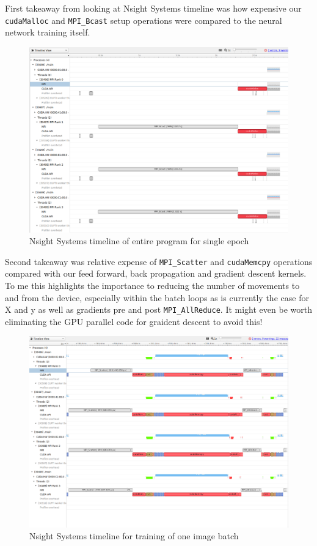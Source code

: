 \documentclass[12pt,letterpaper,twoside]{article}
\begin{document}
First takeaway from looking at Nsight Systems timeline was how expensive our 
\texttt{cudaMalloc} and \texttt{MPI\_Bcast} setup operations were compared to the 
neural network training itself. 

\begin{figure}[!htbp]
    \centering
    \includegraphics[scale=0.35]{nsight_systems_overview.png}
    \caption{Nsight Systems timeline of entire program for single epoch}
\end{figure}

Second takeaway was relative expense of \texttt{MPI\_Scatter} and \texttt{cudaMemcpy}
operations compared with our feed forward, back propagation and gradient descent kernels.
To me this highlights the importance to reducing the number of movements to and from the 
device, especially within the batch loops as is currently the case for X and y as well 
as gradients pre and post \texttt{MPI\_AllReduce}. It might even be worth eliminating 
the GPU parallel code for graident descent to avoid this!

\begin{figure}[!htbp]
    \centering
    \includegraphics[scale=0.3]{nsight_systems_batch.png}
    \caption{Nsight Systems timeline for training of one image batch}
\end{figure}
\end{document}
